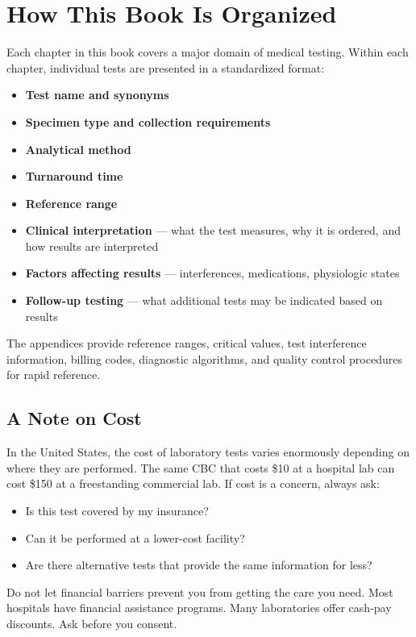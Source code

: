 \clearpage
\section{How This Book Is Organized}

Each chapter in this book covers a major domain of medical testing. Within each chapter, individual tests are presented in a standardized format:

\begin{itemize}
    \item \textbf{Test name and synonyms}
    \item \textbf{Specimen type and collection requirements}
    \item \textbf{Analytical method}
    \item \textbf{Turnaround time}
    \item \textbf{Reference range}
    \item \textbf{Clinical interpretation} --- what the test measures, why it is ordered, and how results are interpreted
    \item \textbf{Factors affecting results} --- interferences, medications, physiologic states
    \item \textbf{Follow-up testing} --- what additional tests may be indicated based on results
\end{itemize}

The appendices provide reference ranges, critical values, test interference information, billing codes, diagnostic algorithms, and quality control procedures for rapid reference.

\subsection{A Note on Cost}

In the United States, the cost of laboratory tests varies enormously depending on where they are performed. The same CBC that costs \$10 at a hospital lab can cost \$150 at a freestanding commercial lab. If cost is a concern, always ask:

\begin{itemize}
    \item Is this test covered by my insurance?
    \item Can it be performed at a lower-cost facility?
    \item Are there alternative tests that provide the same information for less?
\end{itemize}

Do not let financial barriers prevent you from getting the care you need. Most hospitals have financial assistance programs. Many laboratories offer cash-pay discounts. Ask before you consent.
